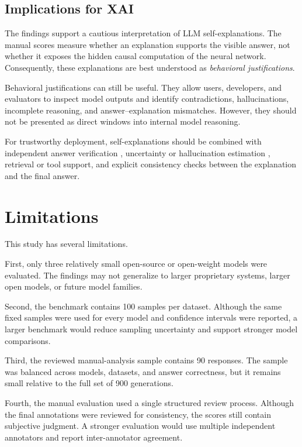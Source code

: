 \documentclass{article}
\begin{document}
\subsection{Implications for XAI}

The findings support a cautious interpretation of LLM
self-explanations. The manual scores measure whether an explanation
supports the visible answer, not whether it exposes the hidden causal
computation of the neural network. Consequently, these explanations are
best understood as \emph{behavioral justifications}.

Behavioral justifications can still be useful. They allow users,
developers, and evaluators to inspect model outputs and identify
contradictions, hallucinations, incomplete reasoning, and
answer--explanation mismatches. However, they should not be presented as
direct windows into internal model reasoning.

For trustworthy deployment, self-explanations should be combined with
independent answer verification \cite{weng2023selfverification},
uncertainty or hallucination estimation
\cite{manakul2023selfcheckgpt,farquhar2024semantic}, retrieval or tool
support, and explicit consistency checks between the explanation and
the final answer.

\section{Limitations}

This study has several limitations.

First, only three relatively small open-source or open-weight models
were evaluated. The findings may not generalize to larger proprietary
systems, larger open models, or future model families.

Second, the benchmark contains 100 samples per dataset. Although the
same fixed samples were used for every model and confidence intervals
were reported, a larger benchmark would reduce sampling uncertainty and
support stronger model comparisons.

Third, the reviewed manual-analysis sample contains 90 responses. The
sample was balanced across models, datasets, and answer correctness, but
it remains small relative to the full set of 900 generations.

Fourth, the manual evaluation used a single structured review process.
Although the final annotations were reviewed for consistency, the
scores still contain subjective judgment. A stronger evaluation would
use multiple independent annotators and report inter-annotator
agreement.
\end{document}

